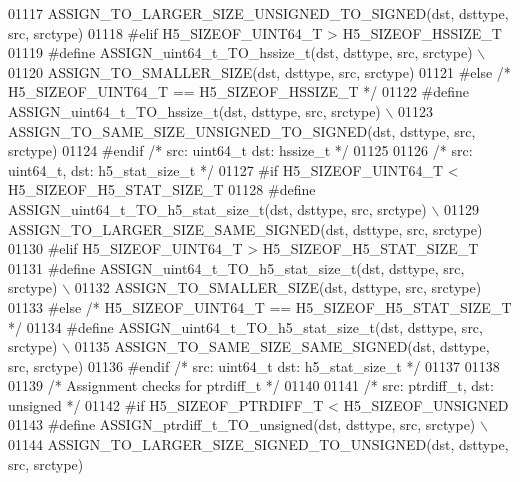 \begin{DoxyCode}
01117 \textcolor{preprocessor}{        ASSIGN\_TO\_LARGER\_SIZE\_UNSIGNED\_TO\_SIGNED(dst, dsttype, src, srctype)}
01118 \textcolor{preprocessor}{#elif H5\_SIZEOF\_UINT64\_T > H5\_SIZEOF\_HSSIZE\_T}
01119 \textcolor{preprocessor}{    #define ASSIGN\_uint64\_t\_TO\_hssize\_t(dst, dsttype, src, srctype) \(\backslash\)}
01120 \textcolor{preprocessor}{        ASSIGN\_TO\_SMALLER\_SIZE(dst, dsttype, src, srctype)}
01121 \textcolor{preprocessor}{#else }\textcolor{comment}{/* H5\_SIZEOF\_UINT64\_T == H5\_SIZEOF\_HSSIZE\_T */}\textcolor{preprocessor}{}
01122 \textcolor{preprocessor}{    #define ASSIGN\_uint64\_t\_TO\_hssize\_t(dst, dsttype, src, srctype) \(\backslash\)}
01123 \textcolor{preprocessor}{        ASSIGN\_TO\_SAME\_SIZE\_UNSIGNED\_TO\_SIGNED(dst, dsttype, src, srctype)}
01124 \textcolor{preprocessor}{#endif }\textcolor{comment}{/* src: uint64\_t dst: hssize\_t */}\textcolor{preprocessor}{}
01125 
01126 \textcolor{comment}{/* src: uint64\_t, dst: h5\_stat\_size\_t */}
01127 \textcolor{preprocessor}{#if H5\_SIZEOF\_UINT64\_T < H5\_SIZEOF\_H5\_STAT\_SIZE\_T}
01128 \textcolor{preprocessor}{    #define ASSIGN\_uint64\_t\_TO\_h5\_stat\_size\_t(dst, dsttype, src, srctype) \(\backslash\)}
01129 \textcolor{preprocessor}{        ASSIGN\_TO\_LARGER\_SIZE\_SAME\_SIGNED(dst, dsttype, src, srctype)}
01130 \textcolor{preprocessor}{#elif H5\_SIZEOF\_UINT64\_T > H5\_SIZEOF\_H5\_STAT\_SIZE\_T}
01131 \textcolor{preprocessor}{    #define ASSIGN\_uint64\_t\_TO\_h5\_stat\_size\_t(dst, dsttype, src, srctype) \(\backslash\)}
01132 \textcolor{preprocessor}{        ASSIGN\_TO\_SMALLER\_SIZE(dst, dsttype, src, srctype)}
01133 \textcolor{preprocessor}{#else }\textcolor{comment}{/* H5\_SIZEOF\_UINT64\_T == H5\_SIZEOF\_H5\_STAT\_SIZE\_T */}\textcolor{preprocessor}{}
01134 \textcolor{preprocessor}{    #define ASSIGN\_uint64\_t\_TO\_h5\_stat\_size\_t(dst, dsttype, src, srctype) \(\backslash\)}
01135 \textcolor{preprocessor}{        ASSIGN\_TO\_SAME\_SIZE\_SAME\_SIGNED(dst, dsttype, src, srctype)}
01136 \textcolor{preprocessor}{#endif }\textcolor{comment}{/* src: uint64\_t dst: h5\_stat\_size\_t */}\textcolor{preprocessor}{}
01137 
01138 
01139 \textcolor{comment}{/* Assignment checks for ptrdiff\_t */}
01140 
01141 \textcolor{comment}{/* src: ptrdiff\_t, dst: unsigned */}
01142 \textcolor{preprocessor}{#if H5\_SIZEOF\_PTRDIFF\_T < H5\_SIZEOF\_UNSIGNED}
01143 \textcolor{preprocessor}{    #define ASSIGN\_ptrdiff\_t\_TO\_unsigned(dst, dsttype, src, srctype) \(\backslash\)}
01144 \textcolor{preprocessor}{        ASSIGN\_TO\_LARGER\_SIZE\_SIGNED\_TO\_UNSIGNED(dst, dsttype, src, srctype)}

\end{DoxyCode}
